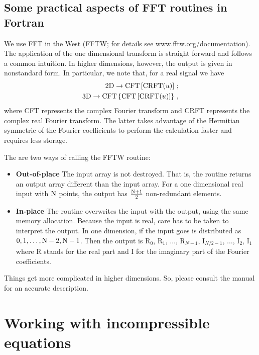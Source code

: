 \documentclass[11pt]{article}
\begin{document}
\subsection*{Some practical aspects of FFT routines in Fortran}
We use FFT in the West (FFTW; for details see {www.fftw.org/documentation}). The application of the one dimensional transform is straight forward and follows a common intuition. In higher dimensions, however, the output is given in nonstandard form. In particular, we note that, for a real signal we have
\begin{align}
    \text{2D} \rightarrow \text{CFT}\left[\text{CRFT}(u)\right]\,; \nonumber \\
    \text{3D} \rightarrow \text{CFT}\left\{\text{CFT}\left[\text{CRFT}(u)\right]\right\}\, , 
\end{align}
where CFT represents the complex Fourier transform and CRFT represents the complex real Fourier transform. The latter
 takes advantage of the Hermitian symmetric of the Fourier coefficients to perform the calculation faster and requires
  less storage.

    The are two ways of calling the FFTW routine:
    \begin{itemize}
        \item {\bf Out-of-place}
            \subitem The input array is not destroyed. That is, the routine returns an output array
                        different than the input array. For a one dimensional real input with $\mathrm{N}$ points, the
                        output has $\tfrac{\mathrm{N}+1}{2}$ non-redundant elements.
        \item {\bf In-place}
            \subitem The routine overwrites the input with the output, using the same memory allocation.
                Because the input is real, care has to be taken to interpret the output. In one dimension,
                 if the input goes is distributed as  $0, 1, \ldots, \mathrm{N}-2, \mathrm{N}-1$. Then the output is 
                 R$_0$, R$_1$, $\ldots$, R$_{N-1}$, I$_{N/2-1}$, $\ldots$, I$_2$, I$_1$\com where R stands
                  for the real part and I for the imaginary part of the Fourier coefficients.
    \end{itemize}

    Things get more complicated in higher dimensions. So, please consult the manual for an accurate description.


\section{Working with incompressible equations}
\end{document}
